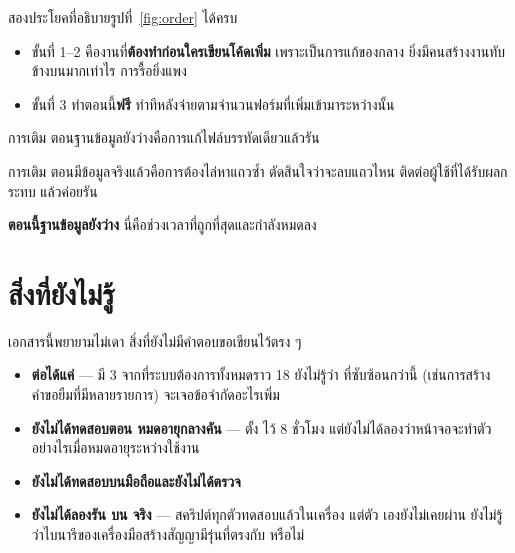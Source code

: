 สองประโยคที่อธิบายรูปที่~\ref{fig:order} ได้ครบ

\begin{itemize}
  \item ขั้นที่ 1--2 คืองานที่\textbf{ต้องทำก่อนใครเขียนโค้ดเพิ่ม}
        เพราะเป็นการแก้ของกลาง ยิ่งมีคนสร้างงานทับข้างบนมากเท่าไร การรื้อยิ่งแพง
  \item ขั้นที่ 3 ทำตอนนี้\textbf{ฟรี} ทำทีหลังจ่ายตามจำนวนฟอร์มที่เพิ่มเข้ามาระหว่างนั้น
\end{itemize}

\begin{warnbox}[title={ขั้นที่ 2 มีหน้าต่างเวลาที่กำลังจะปิด}]
การเติม  ตอนฐานข้อมูลยังว่างคือการแก้ไฟล์บรรทัดเดียวแล้วรัน 

การเติม  ตอนมีข้อมูลจริงแล้วคือการต้องไล่หาแถวซ้ำ ตัดสินใจว่าจะลบแถวไหน
ติดต่อผู้ใช้ที่ได้รับผลกระทบ แล้วค่อยรัน 

\textbf{ตอนนี้ฐานข้อมูลยังว่าง} นี่คือช่วงเวลาที่ถูกที่สุดและกำลังหมดลง
\end{warnbox}

\section{สิ่งที่ยังไม่รู้}

เอกสารนี้พยายามไม่เดา สิ่งที่ยังไม่มีคำตอบขอเขียนไว้ตรง ๆ

\begin{itemize}
  \item \textbf{ต่อได้แค่ } ---  มี 3 
        จากที่ระบบต้องการทั้งหมดราว 18 ยังไม่รู้ว่า  ที่ซับซ้อนกว่านี้
        (เช่นการสร้างคำขอยืมที่มีหลายรายการ) จะเจอข้อจำกัดอะไรเพิ่ม
  \item \textbf{ยังไม่ได้ทดสอบตอน  หมดอายุกลางคัน} --- ตั้ง  ไว้ 8 ชั่วโมง
        แต่ยังไม่ได้ลองว่าหน้าจอจะทำตัวอย่างไรเมื่อหมดอายุระหว่างใช้งาน
  \item \textbf{ยังไม่ได้ทดสอบบนมือถือและยังไม่ได้ตรวจ }
  \item \textbf{ยังไม่ได้ลองรัน  บน  จริง} ---
        สคริปต์ทุกตัวทดสอบแล้วในเครื่อง แต่ตัว  เองยังไม่เคยผ่าน 
        ยังไม่รู้ว่าไบนารีของเครื่องมือสร้างสัญญามีรุ่นที่ตรงกับ  หรือไม่
\end{itemize}

\clearpage

\appendix
